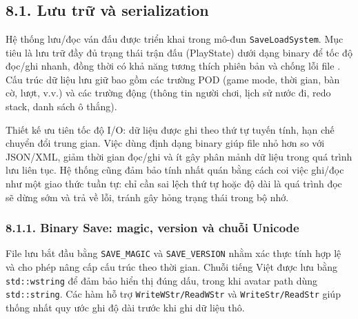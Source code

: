 \newpage
\chapter*{}
\setlength{\parindent}{1.5em}

\section*{8.1. Lưu trữ và serialization}

\setlength{\parindent}{1.5em} Hệ thống lưu/đọc ván đấu được triển khai trong mô-đun \texttt{SaveLoadSystem}. Mục tiêu là lưu trữ đầy đủ trạng thái trận đấu (PlayState) dưới dạng binary để tốc độ đọc/ghi nhanh, đồng thời có khả năng tương thích phiên bản và chống lỗi file \cite{ms_cpp_language_ref}. Cấu trúc dữ liệu lưu giữ bao gồm các trường POD (game mode, thời gian, bàn cờ, lượt, v.v.) và các trường động (thông tin người chơi, lịch sử nước đi, redo stack, danh sách ô thắng).

\setlength{\parindent}{1.5em} Thiết kế ưu tiên tốc độ I/O: dữ liệu được ghi theo thứ tự tuyến tính, hạn chế chuyển đổi trung gian. Việc dùng định dạng binary giúp file nhỏ hơn so với JSON/XML, giảm thời gian đọc/ghi và ít gây phân mảnh dữ liệu trong quá trình lưu liên tục. Hệ thống cũng đảm bảo tính nhất quán bằng cách coi việc ghi/đọc như một giao thức tuần tự: chỉ cần sai lệch thứ tự hoặc độ dài là quá trình đọc sẽ dừng sớm và trả về lỗi, tránh gây hỏng trạng thái trong bộ nhớ.

\subsection*{8.1.1. Binary Save: magic, version và chuỗi Unicode}

\setlength{\parindent}{1.5em} File lưu bắt đầu bằng \texttt{SAVE\_MAGIC} và \texttt{SAVE\_VERSION} nhằm xác thực tính hợp lệ và cho phép nâng cấp cấu trúc theo thời gian. Chuỗi tiếng Việt được lưu bằng \texttt{std::wstring} để đảm bảo hiển thị đúng dấu, trong khi avatar path dùng \texttt{std::string}. Các hàm hỗ trợ \texttt{WriteWStr/ReadWStr} và \texttt{WriteStr/ReadStr} giúp thống nhất quy ước ghi độ dài trước khi ghi dữ liệu thô.

